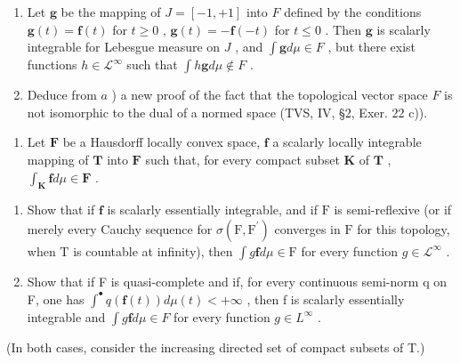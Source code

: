 \begin{enumerate}
\def\labelenumi{\alph{enumi})}
\setcounter{enumi}{1}
\item
  Let \(\mathbf{g}\) be the mapping of \(J = [-1, +1]\) into \(F\) defined by the conditions \(\mathbf{g}(t) = \mathbf{f}(t)\) for \(t \geqslant 0\) , \(\mathbf{g}(t) = -\mathbf{f}(-t)\) for \(t \leqslant 0\) . Then \(\mathbf{g}\) is scalarly integrable for Lebesgue measure on \(J\) , and \(\int \mathbf{g} d\mu \in F\) , but there exist functions \(h \in \mathcal{L}^{\infty}\) such that \(\int h\mathbf{g} d\mu \notin F\) .
\item
  Deduce from \(a\) ) a new proof of the fact that the topological vector space \(F\) is not isomorphic to the dual of a normed space (TVS, IV, §2, Exer. 22 c)).
\end{enumerate}

\begin{enumerate}
\def\labelenumi{\arabic{enumi})}
\setcounter{enumi}{7}
\tightlist
\item
  Let \(\mathbf{F}\) be a Hausdorff locally convex space, \(\mathbf{f}\) a scalarly locally integrable mapping of \(\mathbf{T}\) into \(\mathbf{F}\) such that, for every compact subset \(\mathbf{K}\) of \(\mathbf{T}\) , \(\int_{\mathbf{K}} \mathbf{f} d\mu \in \mathbf{F}\) .
\end{enumerate}

\begin{enumerate}
\def\labelenumi{\alph{enumi})}
\item
  Show that if \(\mathbf{f}\) is scalarly essentially integrable, and if \(\mathrm{F}\) is semi-reflexive (or if merely every Cauchy sequence for \(\sigma (\mathrm{F},\mathrm{F}^{\prime})\) converges in \(\mathrm{F}\) for this topology, when \(\mathrm{T}\) is countable at infinity), then \(\int g\mathbf{f}d\mu \in \mathrm{F}\) for every function \(g\in \mathcal{L}^{\infty}\) .
\item
  Show that if F is quasi-complete and if, for every continuous semi-norm q on F, one has \(\int^{\bullet} q(\mathbf{f}(t)) d\mu(t) < +\infty\) , then f is scalarly essentially integrable and \(\int g\mathbf{f} d\mu \in F\) for every function \(g \in L^{\infty}\) .
\end{enumerate}

(In both cases, consider the increasing directed set of compact subsets of T.)


